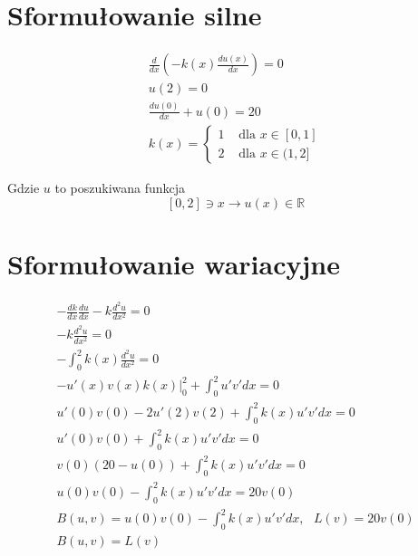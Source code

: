 \documentclass{article}
\begin{document}
\section{Sformułowanie silne}
$$
\begin{gathered}
    \frac{d}{d x}\left(-k(x) \frac{d u(x)}{d x}\right)=0 \\
    u(2)=0 \\
    \frac{d u(0)}{d x}+u(0)=20 \\
k(x)= \begin{cases}1 & \text { dla } x \in[0,1] \\
    2 & \text { dla } x \in(1,2]\end{cases}
\end{gathered}
$$

Gdzie $u$ to poszukiwana funkcja
$$
[0,2] \ni x \rightarrow u(x) \in \mathbb{R}
$$

\section{Sformułowanie wariacyjne}
$$
\begin{gathered}
-\frac{dk}{dx}\frac{du}{dx} - k\frac{d^2u}{dx^2} = 0\\
- k\frac{d^2u}{dx^2} = 0\\
-\int_0^2k(x)\frac{d^2u}{dx^2} = 0\\
-u'(x)v(x)k(x)\big\rvert^2_0 + \int_0^2u'v'dx = 0\\
u'(0)v(0) - 2u'(2)v(2) + \int_0^2k(x)u'v'dx = 0\\
u'(0)v(0) + \int_0^2k(x)u'v'dx = 0\\
v(0)(20 - u(0)) + \int_0^2k(x)u'v'dx = 0\\
 u(0)v(0) -\int_0^2k(x)u'v'dx= 20v(0)\\
B(u,v ) = u(0)v(0) - \int_0^2k(x)u'v'dx, \text{ } L(v) = 20v(0)\\
B(u, v) = L(v)\\
\end{gathered}
$$
\end{document}
